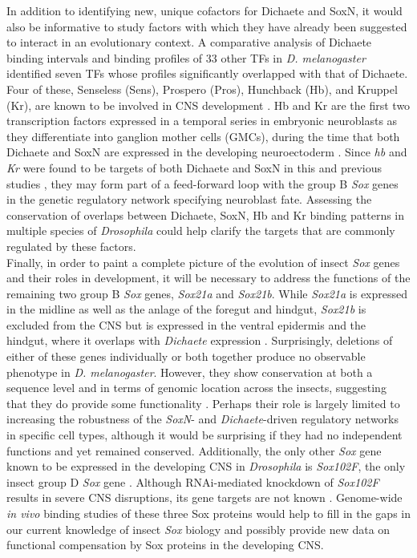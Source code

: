 In addition to identifying new, unique cofactors for Dichaete and SoxN, it would also be informative to study factors with which they have already been suggested to interact in an evolutionary context. A comparative analysis of Dichaete binding intervals and binding profiles of 33 other TFs in \emph{D. melanogaster} identified seven TFs whose profiles significantly overlapped with that of Dichaete. Four of these, Senseless (Sens), Prospero (Pros), Hunchback (Hb), and Kruppel (Kr), are known to be involved in CNS development \citep{aleksic_role_2013}. Hb and Kr are the first two transcription factors expressed in a temporal series in embryonic neuroblasts as they differentiate into ganglion mother cells (GMCs), during the time that both Dichaete and SoxN are expressed in the developing neuroectoderm \citep{buescher_formation_2002,maurange_brainy_2005,overton_evidence_2002}. Since \emph{hb} and \emph{Kr} were found to be targets of both Dichaete and SoxN in this and previous studies \citep{aleksic_role_2013,ferrero_soxneuro_2014}, they may form part of a feed-forward loop with the group B \emph{Sox} genes in the genetic regulatory network specifying neuroblast fate. Assessing the conservation of overlaps between Dichaete, SoxN, Hb and Kr binding patterns in multiple species of \emph{Drosophila} could help clarify the targets that are commonly regulated by these factors.\\

Finally, in order to paint a complete picture of the evolution of insect \emph{Sox} genes and their roles in development, it will be necessary to address the functions of the remaining two group B \emph{Sox} genes, \emph{Sox21a} and \emph{Sox21b}. While \emph{Sox21a} is expressed in the midline as well as the anlage of the foregut and hindgut, \emph{Sox21b} is excluded from the CNS but is expressed in the ventral epidermis and the hindgut, where it overlaps with \emph{Dichaete} expression \citep{cremazy_genome-wide_2001,mckimmie_conserved_2005,phochanukul_no_2010}. Surprisingly, deletions of either of these genes individually or both together produce no observable phenotype in \emph{D. melanogaster}. However, they show conservation at both a sequence level and in terms of genomic location across the insects, suggesting that they do provide some functionality \citep{mckimmie_conserved_2005}. Perhaps their role is largely limited to increasing the robustness of the \emph{SoxN}- and \emph{Dichaete}-driven regulatory networks in specific cell types, although it would be surprising if they had no independent functions and yet remained conserved. Additionally, the only other \emph{Sox} gene known to be expressed in the developing CNS in \emph{Drosophila} is \emph{Sox102F}, the only insect group D \emph{Sox} gene \citep{cremazy_genome-wide_2001,phochanukul_no_2010}. Although RNAi-mediated knockdown of \emph{Sox102F} results in severe CNS disruptions, its gene targets are not known \citep{phochanukul_no_2010}. Genome-wide \emph{in vivo} binding studies of these three Sox proteins would help to fill in the gaps in our current knowledge of insect \emph{Sox} biology and possibly provide new data on functional compensation by Sox proteins in the developing CNS.

